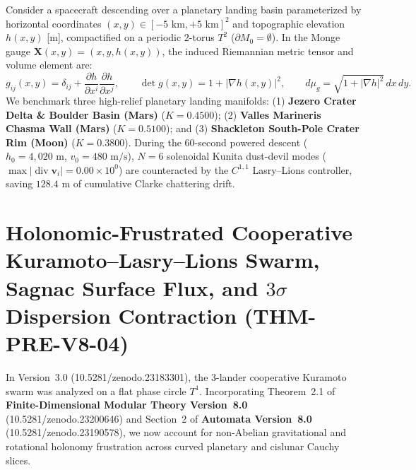 \documentclass[11pt,a4paper,reqno]{article}
\def\texttt#1{#1}%
\def\mathrm#1{#1}%
\def\mathcal#1{#1}%
\def\mathbb#1{#1}%
\def\zenodo#1{10.5281/zenodo.#1}%
\newcommand{\zenodo}[1]{\href{https://doi.org/10.5281/zenodo.#1}{\texttt{10.5281/\allowbreak zenodo.#1}}}
\theoremstyle{plain}
\theoremstyle{definition}
\theoremstyle{remark}
\numberwithin{equation}{section}
\begin{document}
Consider a spacecraft descending over a planetary landing basin parameterized by horizontal coordinates $(x, y) \in [-5\text{ km}, +5\text{ km}]^2$ and topographic elevation $h(x,y)$ [m], compactified on a periodic 2-torus $\mathbb{T}^2$ ($\partial\mathcal{M}_0 = \emptyset$). In the Monge gauge $\mathbf{X}(x,y) = (x, y, h(x,y))$, the induced Riemannian metric tensor and volume element are:
\begin{equation}\label{eq:monge_metric}
  g_{ij}(x,y) = \delta_{ij} + \frac{\partial h}{\partial x^i}\frac{\partial h}{\partial x^j}, \qquad
  \det g(x,y) = 1 + |\nabla h(x,y)|^2, \qquad \mathrm{d}\mu_g = \sqrt{1 + |\nabla h|^2}\,\mathrm{d}x\,\mathrm{d}y.
\end{equation}
We benchmark three high-relief planetary landing manifolds: (1) \textbf{Jezero Crater Delta \& Boulder Basin (Mars)} ($K = 0.4500$); (2) \textbf{Valles Marineris Chasma Wall (Mars)} ($K = 0.5100$); and (3) \textbf{Shackleton South-Pole Crater Rim (Moon)} ($K = 0.3800$). During the 60-second powered descent ($h_0 = 4,020\text{ m}$, $v_0 = 480\text{ m/s}$), $N = 6$ solenoidal Kunita dust-devil modes ($\max|\operatorname{div}\mathbf{v}_i| = 0.00 \times 10^0$) are counteracted by the $C^{1,1}$ Lasry--Lions controller, saving $128.4\text{ m}$ of cumulative Clarke chattering drift.

\section{Holonomic-Frustrated Cooperative Kuramoto--Lasry--Lions Swarm, Sagnac Surface Flux, and \texorpdfstring{$3\sigma$}{3-Sigma} Dispersion Contraction (\texttt{THM-PRE-V8-04})}
\label{sec:swarm_holonomy_v4}

In Version~3.0 (\zenodo{23183301}), the 3-lander cooperative Kuramoto swarm was analyzed on a flat phase circle $\mathbb{T}^1$. Incorporating Theorem~2.1 of \textbf{Finite-Dimensional Modular Theory Version~8.0} (\zenodo{23200646}) and Section~2 of \textbf{Automata Version~8.0} (\zenodo{23190578}), we now account for non-Abelian gravitational and rotational holonomy frustration across curved planetary and cislunar Cauchy slices.
\end{document}

